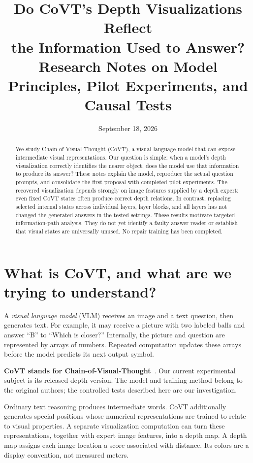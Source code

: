 \documentclass[11pt]{article}
\title{Do CoVT's Depth Visualizations Reflect\\the Information Used to Answer?\\[4pt]\large Research Notes on Model Principles, Pilot Experiments, and Causal Tests}
\author{}
\date{September 18, 2026}
\begin{document}
\maketitle
\begin{abstract}
We study Chain-of-Visual-Thought (CoVT), a visual language model that can expose intermediate visual representations. Our question is simple: when a model's depth visualization correctly identifies the nearer object, does the model use that information to produce its answer? These notes explain the model, reproduce the actual question prompts, and consolidate the first proposal with completed pilot experiments. The recovered visualization depends strongly on image features supplied by a depth expert: even fixed CoVT states often produce correct depth relations. In contrast, replacing selected internal states across individual layers, layer blocks, and all layers has not changed the generated answers in the tested settings. These results motivate targeted information-path analysis. They do not yet identify a faulty answer reader or establish that visual states are universally unused. No repair training has been completed.
\end{abstract}

\section{What is CoVT, and what are we trying to understand?}
A \emph{visual language model} (VLM) receives an image and a text question, then generates text. For example, it may receive a picture with two labeled balls and answer ``B'' to ``Which is closer?'' Internally, the picture and question are represented by arrays of numbers. Repeated computation updates these arrays before the model predicts its next output symbol.

\textbf{CoVT stands for Chain-of-Visual-Thought}~\cite{covt}. Our current experimental subject is its released depth version. The model and training method belong to the original authors; the controlled tests described here are our investigation.

Ordinary text reasoning produces intermediate words. CoVT additionally generates special positions whose numerical representations are trained to relate to visual properties. A separate visualization computation can turn these representations, together with expert image features, into a depth map. A depth map assigns each image location a score associated with distance. Its colors are a display convention, not measured meters.
\end{document}
